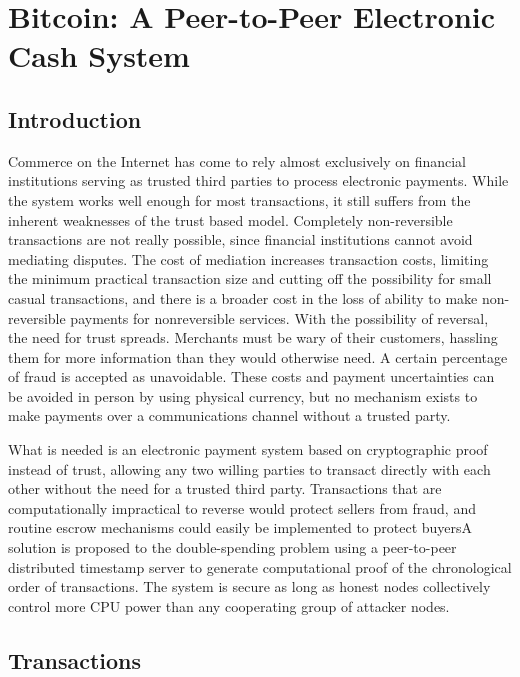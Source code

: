 %
%

\chapter{Bitcoin: A Peer-to-Peer Electronic Cash System}
\section{Introduction}

Commerce on the Internet has come to rely almost exclusively on financial institutions serving as
trusted third parties to process electronic payments. While the system works well enough for
most transactions, it still suffers from the inherent weaknesses of the trust based model.
Completely non-reversible transactions are not really possible, since financial institutions cannot
avoid mediating disputes. The cost of mediation increases transaction costs, limiting the
minimum practical transaction size and cutting off the possibility for small casual transactions,
and there is a broader cost in the loss of ability to make non-reversible payments for nonreversible
services. With the possibility of reversal, the need for trust spreads. Merchants must
be wary of their customers, hassling them for more information than they would otherwise need.
A certain percentage of fraud is accepted as unavoidable. These costs and payment uncertainties
can be avoided in person by using physical currency, but no mechanism exists to make payments
over a communications channel without a trusted party.

What is needed is an electronic payment system based on cryptographic proof instead of trust,
allowing any two willing parties to transact directly with each other without the need for a trusted
third party. Transactions that are computationally impractical to reverse would protect sellers
from fraud, and routine escrow mechanisms could easily be implemented to protect buyersA solution is proposed  to the double-spending problem using a peer-to-peer distributed
timestamp server to generate computational proof of the chronological order of transactions. The
system is secure as long as honest nodes collectively control more CPU power than any
cooperating group of attacker nodes.

\section{Transactions}

